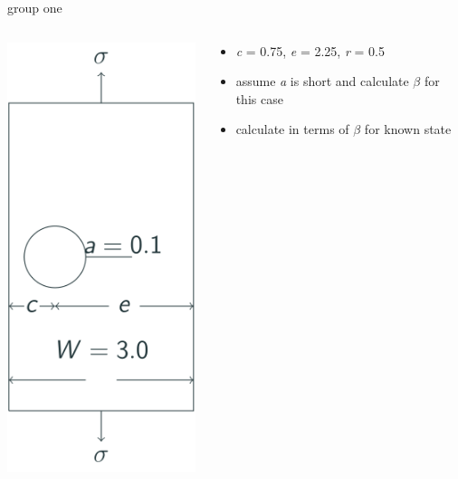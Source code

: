 \documentclass[
  letterpaper,
  ignorenonframetext,
  aspectratio=43,
  handout,
  12pt]{beamer}
\providecommand{\tightlist}{%
  \setlength{\itemsep}{0pt}\setlength{\parskip}{0pt}}
\providecommand{\tightlist}{%
\setlength{\itemsep}{0pt}\setlength{\parskip}{0pt}}
\let\Oldincludegraphics\includegraphics
\renewcommand{\includegraphics}[2][]{\Oldincludegraphics[width=\textwidth,height=0.7\textheight,keepaspectratio]{#2}}
\begin{document}
\begin{frame}{group one}
\protect\hypertarget{group-one}{}
\begin{columns}[T]
\begin{column}{0.5\textwidth}
\includegraphics{../images/curved-group1.svg}
\end{column}

\begin{column}{0.5\textwidth}
\begin{itemize}
\tightlist
\item
  \emph{c} = 0.75, \emph{e} = 2.25, \emph{r} = 0.5
\item
  assume \emph{a} is short and calculate \(\beta\) for this case
\item
  calculate in terms of \(\beta\) for known state
\end{itemize}
\end{column}
\end{columns}
\end{frame}
\end{document}
